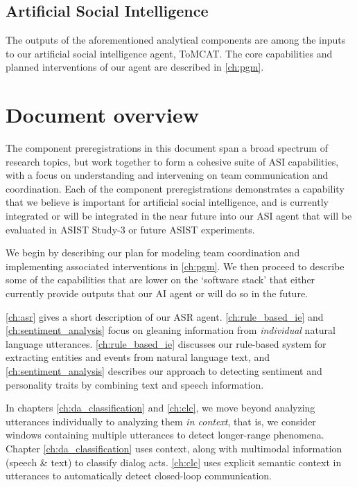 \subsection{Artificial Social Intelligence}

The outputs of the aforementioned analytical components are among the inputs to
our artificial social intelligence agent, ToMCAT. The core capabilities and
planned interventions of our agent are described in \autoref{ch:pgm}.

\section{Document overview}


The component preregistrations in this document span a broad spectrum of
research topics, but work together to form a cohesive suite of ASI
capabilities, with a focus on understanding and intervening on team
communication and coordination.
Each of the component preregistrations demonstrates a capability that we
believe is important for artificial social intelligence, and is currently
integrated or will be integrated in the near future into our ASI agent that
will be evaluated in ASIST Study-3 or future ASIST experiments.

We begin by describing our plan for modeling team coordination and implementing
associated interventions in \autoref{ch:pgm}.  We then proceed to describe some
of the capabilities that are lower on the `software stack' that either
currently provide outputs that our AI agent or will do so in the future.

\autoref{ch:asr} gives a short description of our ASR agent.
\autoref{ch:rule_based_ie} and \autoref{ch:sentiment_analysis} focus on
gleaning information from \emph{individual} natural language utterances.
\autoref{ch:rule_based_ie} discusses our rule-based system for extracting
entities and events from natural language text, and
\autoref{ch:sentiment_analysis} describes our approach to detecting sentiment
and personality traits by combining text and speech information.

In chapters \autoref{ch:da_classification} and \autoref{ch:clc}, we move beyond
analyzing utterances individually to analyzing them \emph{in context}, that is,
we consider windows containing multiple utterances to detect longer-range
phenomena. Chapter \autoref{ch:da_classification} uses context, along with
multimodal information (speech \& text) to classify dialog acts.
\autoref{ch:clc} uses explicit semantic context in utterances to automatically
detect closed-loop communication.

